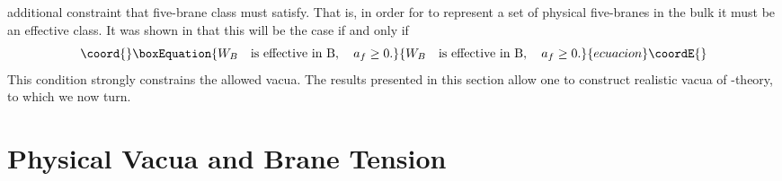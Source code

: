 \documentclass[a4paper,12pt]{article}
\numberwithin{equation}{section}
\theoremstyle{plain}
\begin{document}
additional constraint that five-brane class \coordHE{} must satisfy. That is, 
in order for \coordHE{} to represent a set of physical five-branes in the bulk 
it must be an effective class. It was shown in \cite{RD1} that this will be 
the case if and only if
%
\begin{equation}\coord{}\boxEquation{
W_{B} \quad \mbox{is effective in B}, \quad a_{f}\geq 0.
\label{eq:49}
}{
W_{B} \quad \mbox{is effective in B}, \quad a_{f}\geq 0.
}{ecuacion}\coordE{}\end{equation}
%
This condition strongly constrains the allowed vacua.
The results presented in this section allow one to construct realistic vacua
of \coordHE{}-theory, to which we now turn.

\section{Physical Vacua and Brane Tension}
\end{document}
